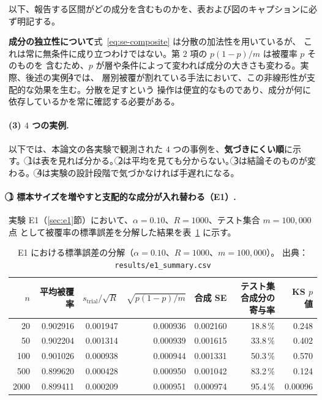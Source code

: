 \documentclass[a4paper,11pt]{jsarticle}
\theoremstyle{definition}
\theoremstyle{plain}
\theoremstyle{remark}
\newcommand{\encircle}[1]{\textcircled{\scriptsize #1}}   %
\begin{document}
以下、報告する区間がどの成分を含むものかを、表および図のキャプションに必ず明記する。

\textbf{成分の独立性について}\quad 式~\eqref{eq:se-composite} は分散の加法性を用いているが、
これは常に無条件に成り立つわけではない。第 $2$ 項の $p(1-p)/m$ は被覆率 $p$ そのものを
含むため、$p$ が層や条件によって変われば成分の大きさも変わる。実際、後述の実例\encircle{4}では、
層別被覆が割れている手法において、この非線形性が支配的な効果を生む。分散を足すという
操作は便宜的なものであり、成分が何に依存しているかを常に確認する必要がある。

\paragraph{(3) $4$ つの実例.}
以下では、本論文の各実験で観測された $4$ つの事例を、\textbf{気づきにくい順}に示す。
\encircle{1}は表を見れば分かる。\encircle{2}は平均を見ても分からない。\encircle{3}は結論そのものが変わる。
\encircle{4}は実験の設計段階で気づかなければ手遅れになる。

\paragraph{\encircle{1} 標本サイズを増やすと支配的な成分が入れ替わる（E1）.}
実験 E1（\ref{sec:e1}節）において、$\alpha=0.10$、$R=1000$、テスト集合 $m=100{,}000$ 点
として被覆率の標準誤差を分解した結果を表~\ref{tab:e1-se-decomp} に示す。

\begin{table}[htbp]
  \centering
  \caption{E1 における標準誤差の分解（$\alpha=0.10$、$R=1000$、$m=100{,}000$）。
    出典：\texttt{results/e1\_summary.csv}}
  \label{tab:e1-se-decomp}
  \small
  \begin{tabular}{rrrrrrr}
    \toprule
    $n$ & 平均被覆率 & $s_{\mathrm{trial}}/\sqrt{R}$ & $\sqrt{p(1-p)/m}$ & 合成 SE & テスト集合成分の寄与率 & KS $p$ 値 \\
    \midrule
    20 & 0.902916 & 0.001947 & 0.000936 & 0.002160 & 18.8\,\% & 0.248 \\
    50 & 0.902204 & 0.001314 & 0.000939 & 0.001615 & 33.8\,\% & 0.402 \\
    100 & 0.901026 & 0.000938 & 0.000944 & 0.001331 & 50.3\,\% & 0.570 \\
    500 & 0.899620 & 0.000428 & 0.000950 & 0.001042 & 83.2\,\% & 0.124 \\
    2000 & 0.899411 & 0.000209 & 0.000951 & 0.000974 & 95.4\,\% & 0.00096 \\
    \bottomrule
  \end{tabular}
\end{table}
\end{document}
